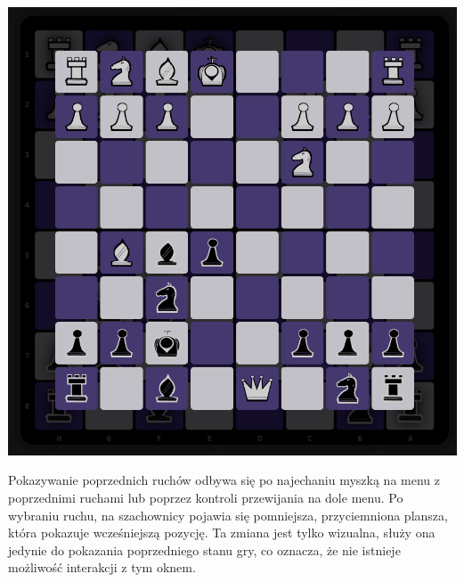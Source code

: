 \documentclass[twoside]{projektInzynierskiMS1}
\begin{document}
\noindent
\begin{minipage}[t]{0.35\textwidth} 
    \vspace{0pt} 
    \centering 
    \includegraphics[width=\linewidth]{images/ins_min_prev.png} 
\end{minipage} 
\hfill 
\begin{minipage}[t]{0.55\textwidth} 
    \vspace{0pt}
    \justifying 
    \noindent 
    Pokazywanie poprzednich ruchów odbywa się po najechaniu myszką na menu z poprzednimi ruchami lub poprzez kontroli przewijania na dole menu. Po wybraniu ruchu, na szachownicy pojawia się pomniejsza, przyciemniona plansza, która pokazuje wcześniejszą pozycję. Ta zmiana jest tylko wizualna, służy ona jedynie do pokazania poprzedniego stanu gry, co oznacza, że nie istnieje możliwość interakcji z tym oknem.
\end{minipage}

\vspace{1cm}
\end{document}
